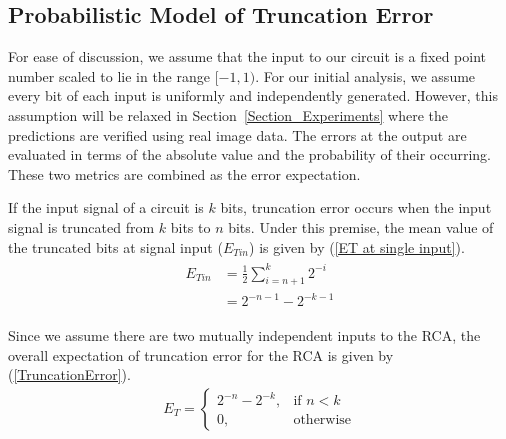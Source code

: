 \documentclass[journal]{IEEEtran}
\begin{document}

\subsection{Probabilistic Model of Truncation Error}\label{section_RCA_TruncationError}
For ease of discussion, we assume that the input to our circuit is a fixed point number scaled to lie in the range $[-1,1)$. For our initial analysis, we assume every bit of each input is uniformly and independently generated. However, this assumption will be relaxed in Section~\ref{Section_Experiments} where the predictions are verified using real image data. The errors at the output are evaluated in terms of the absolute value and the probability of their occurring. These two metrics are combined as the error expectation.

If the input signal of a circuit is $k$ bits, truncation error occurs when the input signal is truncated from $k$ bits to $n$ bits. Under this premise, the mean value of the truncated bits at signal input ($E_{Tin}$) is given by (\ref{ET at single input}).
%
\begin{eqnarray}\label{ET at single input}
  \begin{split}
    E_{Tin} &= \frac{1}{2}\sum_{i=n+1}^{k}2^{-i}\\
    &= 2^{-n-1}-2^{-k-1}
  \end{split}
\end{eqnarray}

Since we assume there are two mutually independent inputs to the RCA, the overall expectation of truncation error for the RCA is given by (\ref{TruncationError}).
%
\begin{eqnarray}\label{TruncationError}
  E_T=\left\{
    \begin{matrix}
        2^{-n}-2^{-k}, & \textrm{if $n<k$}\\
        0, & \textrm{otherwise}
    \end{matrix}
  \right.
\end{eqnarray}
\end{document}
